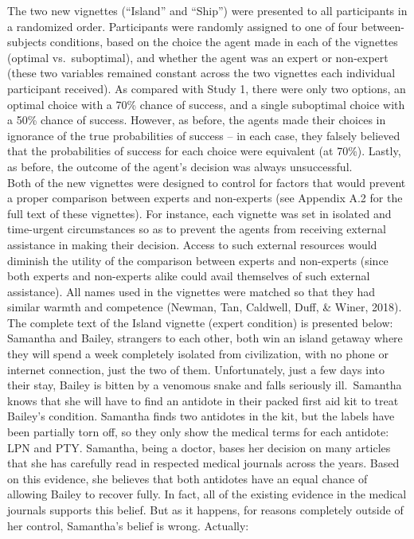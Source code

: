 \documentclass[
  man, donotrepeattitle,floatsintext]{apa6}
\begin{document}
The two new vignettes (``Island'' and ``Ship'') were presented to all participants in a randomized order. Participants were randomly assigned to one of four between-subjects conditions, based on the choice the agent made in each of the vignettes (optimal vs.~suboptimal), and whether the agent was an expert or non-expert (these two variables remained constant across the two vignettes each individual participant received). As compared with Study 1, there were only two options, an optimal choice with a 70\% chance of success, and a single suboptimal choice with a 50\% chance of success. However, as before, the agents made their choices in ignorance of the true probabilities of success -- in each case, they falsely believed that the probabilities of success for each choice were equivalent (at 70\%). Lastly, as before, the outcome of the agent's decision was always unsuccessful.\\
Both of the new vignettes were designed to control for factors that would prevent a proper comparison between experts and non-experts (see Appendix A.2 for the full text of these vignettes). For instance, each vignette was set in isolated and time-urgent circumstances so as to prevent the agents from receiving external assistance in making their decision. Access to such external resources would diminish the utility of the comparison between experts and non-experts (since both experts and non-experts alike could avail themselves of such external assistance). All names used in the vignettes were matched so that they had similar warmth and competence (Newman, Tan, Caldwell, Duff, \& Winer, 2018). The complete text of the Island vignette (expert condition) is presented below:\\
Samantha and Bailey, strangers to each other, both win an island getaway where they will spend a week completely isolated from civilization, with no phone or internet connection, just the two of them. Unfortunately, just a few days into their stay, Bailey is bitten by a venomous snake and falls seriously ill.~Samantha knows that she will have to find an antidote in their packed first aid kit to treat Bailey's condition. Samantha finds two antidotes in the kit, but the labels have been partially torn off, so they only show the medical terms for each antidote: LPN and PTY. Samantha, being a doctor, bases her decision on many articles that she has carefully read in respected medical journals across the years. Based on this evidence, she believes that both antidotes have an equal chance of allowing Bailey to recover fully. In fact, all of the existing evidence in the medical journals supports this belief. But as it happens, for reasons completely outside of her control, Samantha's belief is wrong. Actually:\\
\end{document}
